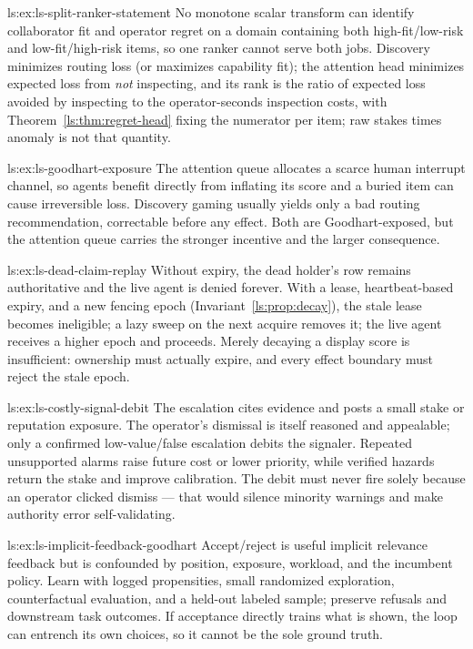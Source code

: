 \begin{pdSolution}{ls:ex:ls-split-ranker-statement}
No monotone scalar transform can identify collaborator fit and operator regret on a domain containing both high-fit/low-risk and low-fit/high-risk items, so one ranker cannot serve both jobs. Discovery minimizes routing loss (or maximizes capability fit); the attention head minimizes expected loss from \emph{not} inspecting, and its rank is the ratio of expected loss avoided by inspecting to the operator-seconds inspection costs, with Theorem~\ref{ls:thm:regret-head} fixing the numerator per item; raw stakes times anomaly is not that quantity.
\end{pdSolution}
\begin{pdSolution}{ls:ex:ls-goodhart-exposure}
The attention queue allocates a scarce human interrupt channel, so agents benefit directly from inflating its score and a buried item can cause irreversible loss. Discovery gaming usually yields only a bad routing recommendation, correctable before any effect. Both are Goodhart-exposed, but the attention queue carries the stronger incentive and the larger consequence.
\end{pdSolution}
\begin{pdSolution}{ls:ex:ls-dead-claim-replay}
Without expiry, the dead holder's row remains authoritative and the live agent is denied forever. With a lease, heartbeat-based expiry, and a new fencing epoch (Invariant~\ref{ls:prop:decay}), the stale lease becomes ineligible; a lazy sweep on the next acquire removes it; the live agent receives a higher epoch and proceeds. Merely decaying a display score is insufficient: ownership must actually expire, and every effect boundary must reject the stale epoch.
\end{pdSolution}
\begin{pdSolution}{ls:ex:ls-costly-signal-debit}
The escalation cites evidence and posts a small stake or reputation exposure. The operator's dismissal is itself reasoned and appealable; only a confirmed low-value/false escalation debits the signaler. Repeated unsupported alarms raise future cost or lower priority, while verified hazards return the stake and improve calibration. The debit must never fire solely because an operator clicked dismiss --- that would silence minority warnings and make authority error self-validating.
\end{pdSolution}
\begin{pdSolution}{ls:ex:ls-implicit-feedback-goodhart}
Accept/reject is useful implicit relevance feedback but is confounded by position, exposure, workload, and the incumbent policy. Learn with logged propensities, small randomized exploration, counterfactual evaluation, and a held-out labeled sample; preserve refusals and downstream task outcomes. If acceptance directly trains what is shown, the loop can entrench its own choices, so it cannot be the sole ground truth.
\end{pdSolution}

